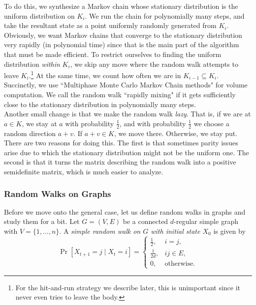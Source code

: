 To do this, we synthesize a Markov chain whose stationary distribution is the uniform distribution on $K_i$. We run the chain for polynomially many steps, and take the resultant state as a point uniformly randomly generated from $K_i$.\\

Obviously, we want Markov chains that converge to the stationary distribution very rapidly (in polynomial time) since that is the main part of the algorithm that must be made efficient. To restrict ourselves to finding the uniform distribution \textit{within} $K_i$, we skip any move where the random walk attempts to leave $K_i$.\footnote{For the hit-and-run strategy we describe later, this is unimportant since it never even tries to leave the body.} At the same time, we count how often we are in $K_{i-1}\subseteq K_i$.\\

Succinctly, we use ``Multiphase Monte Carlo Markov Chain methods" for volume computation. We call the random walk ``rapidly mixing" if it gets sufficiently close to the stationary distribution in polynomially many steps.\\

Another small change is that we make the random walk \textit{lazy}. That is, if we are at $a\in K$,  we stay at $a$ with probability $\frac{1}{2}$, and with probability $\frac{1}{2}$ we choose a random direction $a+v$. If $a+v\in K$, we move there. Otherwise, we stay put. There are two reasons for doing this. The first is that sometimes parity issues arise due to which the stationary distribution might not be the uniform one. The second is that it turns the matrix describing the random walk into a positive semidefinite matrix, which is much easier to analyze.

\subsubsection{Random Walks on Graphs}

Before we move onto the general case, let us define random walks in graphs and study them for a bit. Let $G=(V,E)$ be a connected $d$-regular simple graph with $V=\{1,\ldots,n\}$. A \textit{simple random walk on $G$ with initial state $X_0$} is given by
\[
\Pr[X_{t+1}=j\mid X_t=i] = 
\begin{cases}
\frac{1}{2}, & i=j, \\
\frac{1}{2d}, & ij\in E, \\
0, & \text{otherwise.}
\end{cases}
\]

